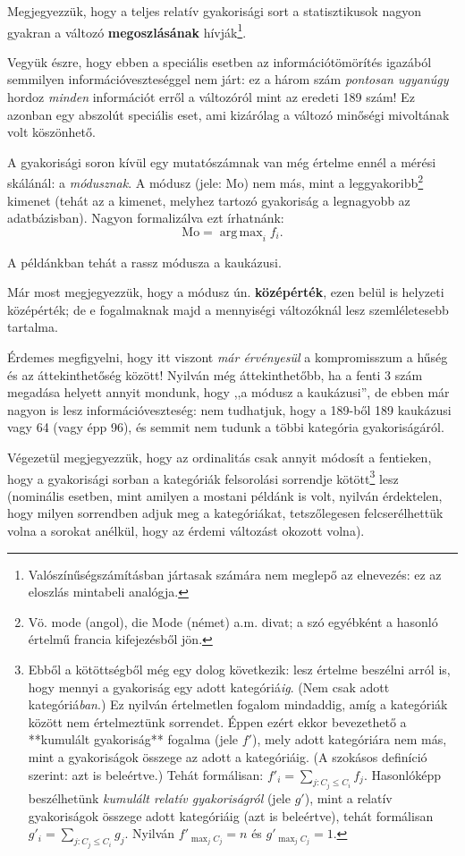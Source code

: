 \documentclass[]{book}
\let\rmarkdownfootnote\footnote%
\def\footnote{\protect\rmarkdownfootnote}
\begin{document}
Megjegyezzük, hogy a teljes relatív gyakorisági sort a statisztikusok nagyon gyakran a változó \textbf{megoszlásának} hívják\footnote{Valószínűségszámításban jártasak számára nem meglepő az elnevezés: ez az eloszlás mintabeli analógja.}.

Vegyük észre, hogy ebben a speciális esetben az információtömörítés igazából semmilyen információveszteséggel nem járt: ez a három szám \emph{pontosan ugyanúgy} hordoz \emph{minden} információt erről a változóról mint az eredeti 189 szám! Ez azonban egy abszolút speciális eset, ami kizárólag a változó minőségi mivoltának volt köszönhető.

A gyakorisági soron kívül egy mutatószámnak van még értelme ennél a mérési skálánál: a \emph{módusznak}. A módusz (jele: \(\mathrm{Mo}\)) nem más, mint a leggyakoribb\footnote{Vö. mode (angol), die Mode (német) a.m. divat; a szó egyébként a hasonló értelmű francia kifejezésből jön.} kimenet (tehát az a kimenet, melyhez tartozó gyakoriság a legnagyobb az adatbázisban). Nagyon formalizálva ezt írhatnánk:
\[
    \mathrm{Mo}=\mathop{\mathrm{arg\,max}}_i f_i.
\]

A példánkban tehát a rassz módusza a kaukázusi.

Már most megjegyezzük, hogy a módusz ún. \textbf{középérték}, ezen belül is helyzeti középérték; de e fogalmaknak majd a mennyiségi változóknál lesz szemléletesebb tartalma.

Érdemes megfigyelni, hogy itt viszont \emph{már érvényesül} a kompromisszum a hűség és az áttekinthetőség között! Nyilván még áttekinthetőbb, ha a fenti 3 szám megadása helyett annyit mondunk, hogy ,,a módusz a kaukázusi'', de ebben már nagyon is lesz információveszteség: nem tudhatjuk, hogy a 189-ből 189 kaukázusi vagy 64 (vagy épp 96), és semmit nem tudunk a többi kategória gyakoriságáról.

Végezetül megjegyezzük, hogy az ordinalitás csak annyit módosít a fentieken, hogy a gyakorisági sorban a kategóriák felsorolási sorrendje kötött\footnote{Ebből a kötöttségből még egy dolog következik: lesz értelme beszélni arról is, hogy mennyi a gyakoriság egy adott kategóriá\emph{ig}. (Nem csak adott kategóriá\emph{ban}.) Ez nyilván értelmetlen fogalom mindaddig, amíg a kategóriák között nem értelmeztünk sorrendet. Éppen ezért ekkor bevezethető a **kumulált gyakoriság** fogalma (jele $f'$), mely adott kategóriára nem más, mint a gyakoriságok összege az adott a kategóriáig. (A szokásos definíció szerint: azt is beleértve.) Tehát formálisan: $f'_i=\sum_{j:C_j\leq C_i} f_j$. Hasonlóképp beszélhetünk \emph{kumulált relatív gyakoriságról} (jele $g'$), mint a relatív gyakoriságok összege adott kategóriáig (azt is beleértve), tehát formálisan $g'_i=\sum_{j:C_j\leq C_i} g_j$. Nyilván $f'_{\max_j C_j}=n$ és $g'_{\max_j C_j}=1$.} lesz (nominális esetben, mint amilyen a mostani példánk is volt, nyilván érdektelen, hogy milyen sorrendben adjuk meg a kategóriákat, tetszőlegesen felcserélhettük volna a sorokat anélkül, hogy az érdemi változást okozott volna).
\end{document}
